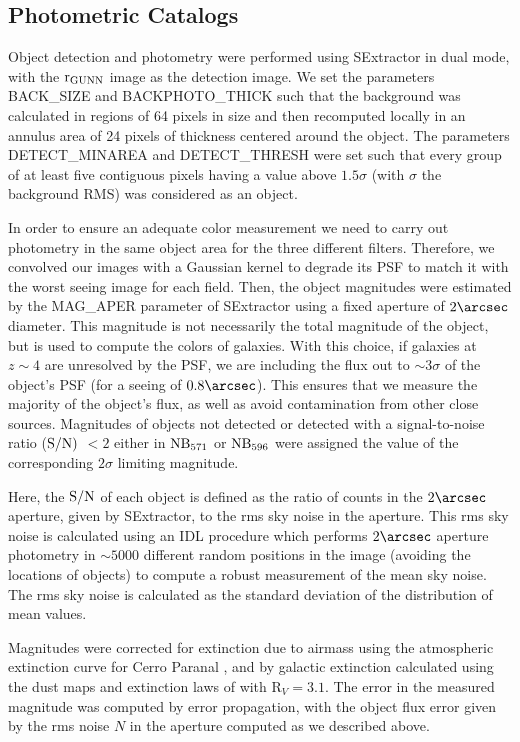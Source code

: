 \documentclass[iop, revtex4]{emulateapj}
\begin{document}
\subsection{Photometric Catalogs}
\label{sec:phot}

Object detection and photometry were performed using SExtractor 
in dual mode, with the $\rm r_{GUNN}$ image as the detection image. We set the parameters BACK\_SIZE and BACKPHOTO\_THICK such that the background was calculated in regions of 64 pixels in size and then recomputed locally in an annulus area of 24 pixels of thickness centered around the object. The parameters DETECT\_MINAREA and DETECT\_THRESH were set such that every group of at least five contiguous pixels having a value above $1.5\sigma$ (with $\sigma$ the background RMS) was considered as an object.

In order to ensure an adequate color measurement we need to carry out
photometry in the same object area for the three different
filters. Therefore, we convolved our images with a
Gaussian kernel to degrade its PSF to match it with the worst seeing
image for each field. Then, the object magnitudes were estimated by
the MAG\_APER parameter of SExtractor using a fixed aperture of
$2\arcsec$ diameter. This magnitude is not necessarily 
the total magnitude of
the object, but is used to compute the colors of galaxies. With this
choice, if galaxies at $z\sim4$ are unresolved by the PSF,
we are
including the flux out to
$\sim3\sigma$ of the object's PSF (for a seeing of $0.8\arcsec$). This
ensures that we measure the majority of the object's flux, as well as
avoid contamination from other close sources. Magnitudes of objects not
detected or detected with a signal-to-noise ratio (${\rm S\slash N})$ $< 2$ either
in $\rm NB_{\rm 571}$ or $\rm NB_{596}$ were assigned the value of the
corresponding $2\sigma$ limiting magnitude.

Here, the ${\rm S\slash N}$ of each object is defined as the ratio of counts in the $2\arcsec$
aperture, given by SExtractor, to the rms sky noise in the aperture. This rms sky noise
 is calculated using an IDL procedure which performs $2\arcsec$ aperture
photometry in $\sim5000$ different random positions in the image
(avoiding the locations of objects) to compute a robust measurement of the
mean sky noise.
The rms sky noise is calculated as the standard deviation of the distribution of
mean values.

Magnitudes were corrected for extinction due to airmass using the
atmospheric extinction curve for Cerro Paranal \citep{Patat11}, and
by galactic extinction calculated using the \citet{Schlegel98} dust
maps and extinction laws of \citet{Cardelli89} with R$_{V} = 3.1$. 
The error in the measured magnitude was computed by error propagation, with the 
object flux error given by the rms noise $N$ in the aperture computed as we described above. 
\end{document}
